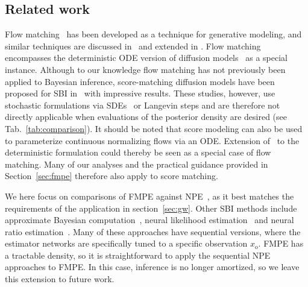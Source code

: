 \documentclass{article}
\theoremstyle{remark}
\begin{document}
\subsection*{Related work}
Flow matching~\cite{flow_matching} has been developed as a technique for generative modeling, and similar techniques are discussed in~\cite{albergo2022building,liu2022flow,neklyudov2022action} and extended in \cite{davtyan2022randomized,tong2023conditional}. Flow matching encompasses the deterministic ODE version of diffusion models~\cite{sohl2015deep,song2019generative,ho2020denoising} as a special instance. Although to our knowledge flow matching has not previously been applied to Bayesian inference, score-matching diffusion models have been proposed for SBI in~\cite{sharrock2022sequential,geffner2022score} with impressive results. These studies, however, use stochastic formulations via SDEs~\cite{song2020score} or Langevin steps and are therefore not directly applicable when evaluations of the posterior density are desired (see Tab.~\ref{tab:comparison}). It should be noted that score modeling can also be used to parameterize continuous normalizing flows via an ODE. Extension of~\cite{sharrock2022sequential,geffner2022score} to the deterministic formulation could thereby be seen as a special case of flow matching. Many of our analyses and the practical guidance provided in Section~\ref{sec:fmpe} therefore also apply to score matching.


We here focus on comparisons of FMPE against NPE~\cite{papamakarios2016fast,lueckmann2017flexible,greenberg2019automatic}, as it best matches the requirements of the application in section~\ref{sec:gw}. Other SBI methods include approximate Bayesian computation~\cite{sisson2018overview,beaumont2002approximate,beaumont2009adaptive,blum2010non,prangle2013semiautomatic}, neural likelihood estimation~\cite{wood2010statistical,drovandi2018approximating,papamakarios2019sequential,lueckmann2019likelihood} and neural ratio estimation~\cite{izbicki2014high,pham2014a,cranmer2015approximating,hermans2019likelihood,durkan2020contrastive,thomas2020likelihoodfree,miller2022contrastive}. Many of these approaches have sequential versions, where the estimator networks are specifically tuned to a specific observation $x_\text{o}$. FMPE has a tractable density, so it is straightforward to apply the sequential NPE~\cite{papamakarios2016fast,lueckmann2017flexible,greenberg2019automatic} approaches to FMPE. In this case, inference is no longer amortized, so we leave this extension to future work. 
\end{document}
